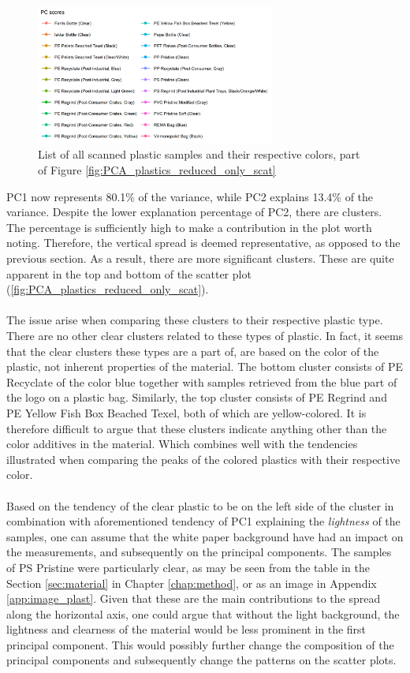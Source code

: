 \begin{figure}[H]
    \centering
    \includegraphics[width=0.7\textwidth]{Images/results/PCA_plastics_reduced_list.png}
    \captionsetup{labelformat=empty}
    \caption[PCA Reduced Set List]{List of all scanned plastic samples and their respective colors, part of Figure \ref{fig:PCA_plastics_reduced_only_scat}}
    \label{fig:PCA_plastics_reduced_list}
\end{figure}
\noindent
PC1 now represents 80.1\% of the variance, while PC2 explains 13.4\% of the variance. Despite the lower explanation percentage of PC2, there are clusters. The percentage is sufficiently high to make a contribution in the plot worth noting. Therefore, the vertical spread is deemed representative, as opposed to the previous section. As a result, there are more significant clusters. These are quite apparent in the top and bottom of the scatter plot (\ref{fig:PCA_plastics_reduced_only_scat}). 
\\\\
The issue arise when comparing these clusters to their respective plastic type. There are no other clear clusters related to these types of plastic. In fact, it seems that the clear clusters these types are a part of, are based on the color of the plastic, not inherent properties of the material. The bottom cluster consists of PE Recyclate of the color blue together with samples retrieved from the blue part of the logo on a plastic bag. Similarly, the top cluster consists of PE Regrind and PE Yellow Fish Box Beached Texel, both of which are yellow-colored. It is therefore difficult to argue that these clusters indicate anything other than the color additives in the material. Which combines well with the tendencies illustrated when comparing the peaks of the colored plastics with their respective color.
\\\\
Based on the tendency of the clear plastic to be on the left side of the cluster in combination with aforementioned tendency of PC1 explaining the \textit{lightness} of the samples, one can assume that the white paper background have had an impact on the measurements, and subsequently on the principal components. The samples of PS Pristine were particularly clear, as may be seen from the table in the Section \ref{sec:material} in Chapter \ref{chap:method}, or as an image in Appendix \ref{app:image_plast}. Given that these are the main contributions to the spread along the horizontal axis, one could argue that without the light background, the lightness and clearness of the material would be less prominent in the first principal component. This would possibly further change the composition of the principal components and subsequently change the patterns on the scatter plots. 
